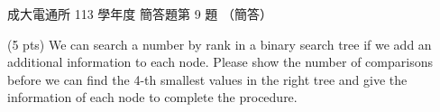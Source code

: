 \begin{pastexam}[label={px:ncku-113-cce-18}]{成大電通所 113 學年度 簡答題第 9 題}
（簡答）

(5 pts) We can search a number by rank in a binary search tree if we add an additional
information to each node. Please show the number of comparisons before we can find the 4-th
smallest values in the right tree and give the information of each node to complete the
procedure.

\begin{center}
\end{center}
\end{pastexam}

